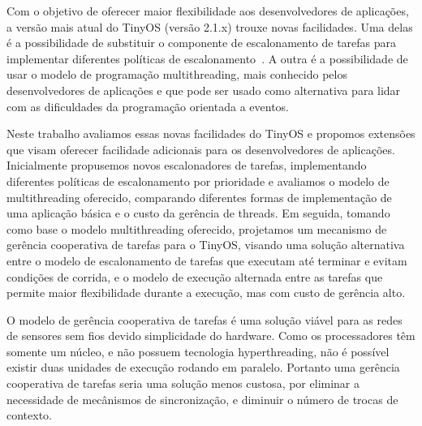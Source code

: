 Com o objetivo de oferecer maior flexibilidade aos desenvolvedores de aplicações, 
a versão mais atual do TinyOS (versão 2.1.x) trouxe novas facilidades.
Uma delas é a possibilidade de substituir o componente de escalonamento de tarefas
para implementar diferentes políticas de escalonamento~\cite{TEP106}.
A outra é a possibilidade de usar o modelo de programação multithreading,
 mais conhecido pelos desenvolvedores de aplicações e que pode
ser usado como alternativa para lidar com as dificuldades da programação orientada a eventos.

Neste trabalho avaliamos essas novas facilidades do TinyOS e propomos extensões que visam oferecer facilidade adicionais
para os desenvolvedores de aplicações.
Inicialmente propusemos novos escalonadores de tarefas, implementando diferentes políticas de escalonamento por
prioridade e avaliamos o modelo de multithreading oferecido, comparando diferentes formas de implementação
de uma aplicação básica e o custo da gerência de threads. Em seguida, tomando como base o modelo multithreading
oferecido, projetamos um mecanismo de gerência cooperativa de tarefas para o TinyOS, visando 
uma solução alternativa entre o modelo de escalonamento de tarefas que executam até terminar 
e evitam condições de corrida, e o modelo de execução alternada entre as tarefas 
que permite maior flexibilidade durante a execução, mas com custo de gerência alto.

O modelo de gerência cooperativa de tarefas é uma solução viável para as redes de sensores sem fios devido simplicidade
do hardware. Como os processadores têm somente um núcleo, e não possuem tecnologia hyperthreading, não é possível 
existir duas unidades de execução rodando em paralelo. Portanto uma gerência cooperativa de tarefas seria uma solução
menos custosa, por eliminar a necessidade de mecânismos de sincronização, e diminuir o número de trocas de contexto.


